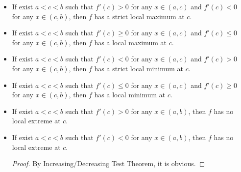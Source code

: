 \documentclass[a4paper,12pt]{report}
\begin{document}
\begin{itemize}
\begin{itemize}
\begin{proof}
    Take any two points $c,d\in (a,b)$ with $c<d$. By MVT, there exists $g\in (c,d)$ such that
    \[f'(g)=\frac{f(d)-f(c)}{d-c}.\]
    Because $f'(g)>0$ and $d-c>0$, we get $f(d)-f(c)>0$.
    
    The second and third statements are obviously true as the first holds.
    
    The "if" directions of the other statements can be proven similarly.
    
    For the "only if" direction of the seventh statement, we want to show that $f'(x)\geq 0$ if $\forall c,d\in (a,b)\colon c<d\implies f(c)\leq f(d)$ and $f$ is differentiable on $(a,b)$.
    
    Fix any $x\in (a,b)$. For any $h>0$ with $(x+h)\in(a,b)$, we have
    \[f(x)\leq f(x+h).\]
    For any $h<0$ with $(x+h)\in(a,b)$, we have
    \[f(x)\geq f(x+h).\]
    Thus for any $h$ with $(x+h)\in(a,b)$, we have
    \[\frac{f(x+h)-f(x)}{h}\geq 0.\]
    The "only if" direction of the tenth statement can be proven similarly.
\end{proof}
\subsubsection{First Derivative Test for Local Extrema Theorem}
Let $f\colon I\subseteq\mathbb{R}\to\mathbb{R}$ be a function, $c$ be a critical point of $f$, and $f'$ be continuous at $c$.
\bit
\item If exist $a<c<b$ such that $f'(c)>0$ for any $x\in (a,c)$ and $f'(c)<0$ for any $x\in (c,b)$, then $f$ has a strict local maximum at $c$.
\item If exist $a<c<b$ such that $f'(c)\geq 0$ for any $x\in (a,c)$ and $f'(c)\leq 0$ for any $x\in (c,b)$, then $f$ has a local maximum at $c$.
\item If exist $a<c<b$ such that $f'(c)<0$ for any $x\in (a,c)$ and $f'(c)>0$ for any $x\in (c,b)$, then $f$ has a strict local minimum at $c$.
\item If exist $a<c<b$ such that $f'(c)\leq 0$ for any $x\in (a,c)$ and $f'(c)\geq 0$ for any $x\in (c,b)$, then $f$ has a local minimum at $c$.
\item If exist $a<c<b$ such that $f'(c)>0$ for any $x\in (a,b)$, then $f$ has no local extreme at $c$.
\item If exist $a<c<b$ such that $f'(c)<0$ for any $x\in (a,b)$, then $f$ has no local extreme at $c$.
\eit
\begin{proof}
    By Increasing/Decreasing Test Theorem, it is obvious.
\end{proof}

\end{itemize}
\end{itemize}
\end{document}
